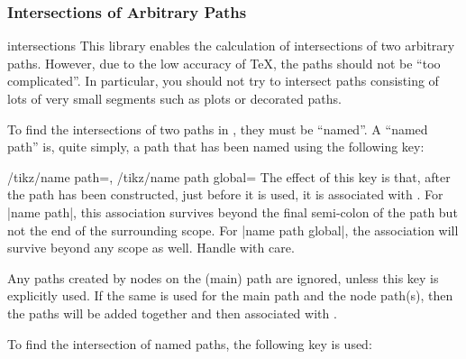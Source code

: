 \subsubsection{Intersections of Arbitrary Paths}

\begin{tikzlibrary}{intersections}
  This library enables the calculation of intersections of
  two arbitrary paths. However, due to the low accuracy of
  \TeX, the paths should not be ``too complicated''.
  In particular, you should not try to intersect paths consisting of
  lots of very small segments such as plots or decorated paths.
\end{tikzlibrary}

To find the intersections of two paths in \tikzname, they must be
``named''. A ``named path'' is, quite simply, a path that has been
named using the following key:

\begin{keylist}{%
	/tikz/name path=,
	/tikz/name path global=}
  The effect of this key is that, after the path has been constructed,
  just before it is used, it is associated with . For |name path|,
  this association survives beyond the final semi-colon of the path
  but not the end of the surrounding scope. For |name path global|, the association
  will survive beyond any scope as well. Handle with care.

  Any paths created by nodes on the (main) path are ignored, unless
  this key is explicitly used. If the same  is used for the
  main path and the node path(s), then the paths will be added
  together and then associated with .
\end{keylist}

To find the intersection of named paths, the following key is used:

